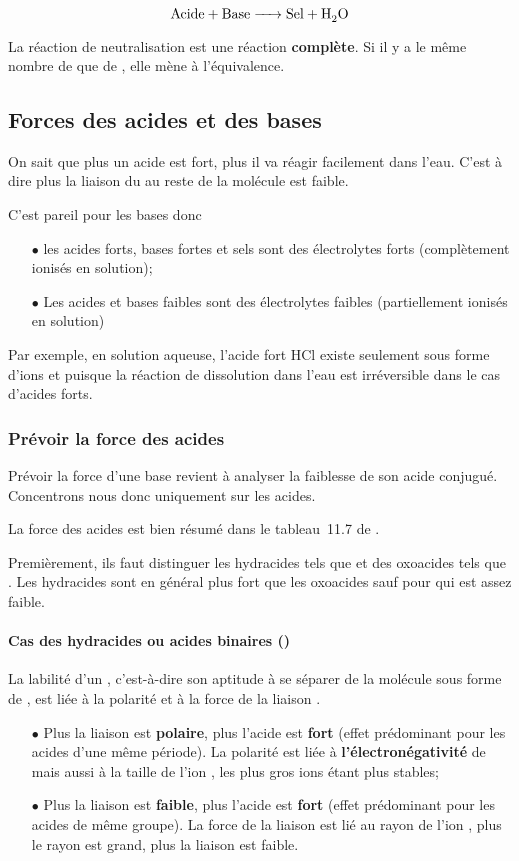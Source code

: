 \[ \ce{Acide + Base -> Sel + H2O} \]

La réaction de neutralisation est une réaction \textbf{complète}.
Si il y a le même nombre de  que de ,
elle mène à l'équivalence.

\subsection{Forces des acides et des bases}
On sait que plus un acide est fort,
plus il va réagir facilement dans l'eau.
C'est à dire plus la liaison du  au reste de la molécule est faible.

C'est pareil pour les bases donc
\begin{itemize}
  \item[$\bullet$] les acides forts,
    bases fortes et sels sont des électrolytes forts
    (complètement ionisés en solution);
  \item[$\bullet$] Les acides et bases faibles sont des électrolytes faibles
    (partiellement ionisés en solution)
\end{itemize}
Par exemple, en solution aqueuse, l'acide fort HCl existe seulement
sous forme d'ions  et  puisque la réaction de dissolution dans
l'eau est irréversible dans le cas d'acides forts.

\subsubsection{Prévoir la force des acides}
Prévoir la force d'une base revient à analyser la faiblesse de
son acide conjugué.
Concentrons nous donc uniquement sur les acides.

La force des acides est bien résumé dans le tableau~11.7 de
\cite[p.~444]{atkins2011principes}.

Premièrement, ils faut distinguer les hydracides tels que  et 
des oxoacides tels que .
Les hydracides sont en général plus fort que les oxoacides sauf pour
 qui est assez faible.

\paragraph{Cas des hydracides ou acides binaires ()}
La labilité d'un ,
c'est-à-dire son aptitude à se séparer de la
molécule  sous forme de ,
est liée à la polarité et à la force de la liaison .
\begin{itemize}
  \item[$\bullet$] Plus la liaison est \textbf{polaire},
    plus l'acide est \textbf{fort}
    (effet prédominant pour les acides d'une même période).
    La polarité est liée à \textbf{l'électronégativité} de
     mais aussi à la taille de l'ion ,
    les plus gros ions étant plus stables;
  \item[$\bullet$] Plus la liaison est \textbf{faible},
    plus l'acide est \textbf{fort}
    (effet prédominant pour les acides de même groupe).
    La force de la liaison est lié au rayon de l'ion ,
    plus le rayon est grand, plus la liaison est faible.
\end{itemize}


